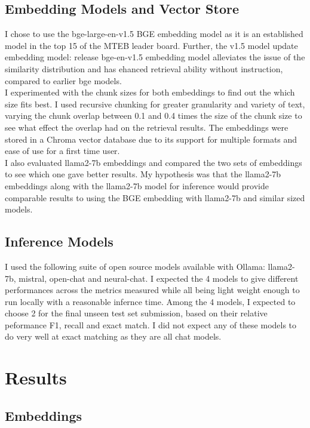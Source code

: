 \documentclass[11pt]{article}
\begin{document}
\subsection{Embedding Models and Vector Store}
I chose to use the bge-large-en-v1.5 BGE embedding model as it is an established model in the top 15 of the MTEB leader board. Further, the v1.5 model update embedding model: release bge-en-v1.5 embedding model alleviates the issue of the similarity distribution and has ehanced retrieval ability without instruction, compared to earlier bge models.
\\
I experimented with the chunk sizes for both embeddings to find out the which size fits best.
I used recursive chunking for greater granularity and variety of text, varying the chunk overlap between 0.1 and 0.4 times the size of the chunk size to see what effect the overlap had on the retrieval results.  The embeddings were stored in a Chroma vector database due to its support for multiple formats and ease of use for a first time user.
\\
I also evaluated llama2-7b embeddings and compared the two sets of embeddings to see which one gave better results. My hypothesis was that the llama2-7b embeddings along with the llama2-7b model for inference would provide comparable results to using the BGE embedding with llama2-7b and similar sized models.
\subsection{Inference Models}
I used the following suite of open source models available with Ollama: llama2-7b, mistral, open-chat and neural-chat. I expected the 4 models to give different performances across the metrics measured while all being light weight enough to run locally with a reasonable infernce time.
Among the 4 models, I expected to choose 2 for the final unseen test set submission, based on their relative peformance F1, recall and exact match. I did not expect any of these models to do very well at exact matching as they are all chat models.

\section{Results}

\subsection{Embeddings}
\end{document}
